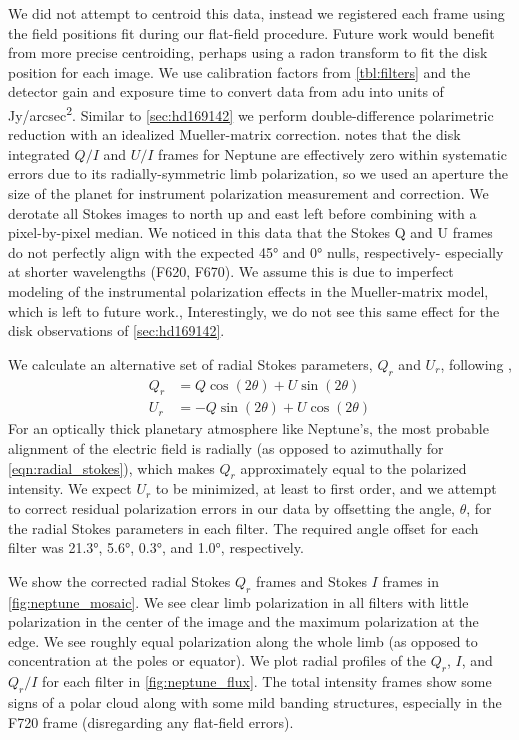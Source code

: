 We did not attempt to centroid this data, instead we registered each frame using the field positions fit during our flat-field procedure. Future work would benefit from more precise centroiding, perhaps using a radon transform to fit the disk position for each image. We use calibration factors from \autoref{tbl:filters} and the detector gain and exposure time to convert data from \si{adu} into units of \si{Jy/arcsec^2}. Similar to \autoref{sec:hd169142} we perform double-difference polarimetric reduction with an idealized Mueller-matrix correction. \citet{schmid_limb_2006} notes that the disk integrated $Q/I$ and $U/I$ frames for Neptune are effectively zero within systematic errors due to its radially-symmetric limb polarization, so we used an aperture the size of the planet for instrument polarization measurement and correction. We derotate all Stokes images to north up and east left before combining with a pixel-by-pixel median. We noticed in this data that the Stokes Q and U frames do not perfectly align with the expected \ang{45} and \ang{0} nulls, respectively- especially at shorter wavelengths (F620, F670). We assume this is due to imperfect modeling of the instrumental polarization effects in the Mueller-matrix model, which is left to future work., Interestingly, we do not see this same effect for the disk observations of \autoref{sec:hd169142}.

We calculate an alternative set of radial Stokes parameters, $Q_r$ and $U_r$, following \citet{schmid_limb_2006},
\begin{align}
    Q_r &= Q\cos{\left(2\theta\right)} + U\sin{\left(2\theta\right)} \\
    U_r &= -Q\sin{\left(2\theta\right)} + U\cos{\left(2\theta\right)}
\end{align}
For an optically thick planetary atmosphere like Neptune's, the most probable alignment of the electric field is radially (as opposed to azimuthally for \autoref{eqn:radial_stokes}), which makes $Q_r$ approximately equal to the polarized intensity. We expect $U_r$ to be minimized, at least to first order, and we attempt to correct residual polarization errors in our data by offsetting the angle, $\theta$, for the radial Stokes parameters in each filter. The required angle offset for each filter was \ang{21.3}, \ang{5.6}, \ang{0.3}, and \ang{1.0}, respectively.

We show the corrected radial Stokes $Q_r$ frames and Stokes $I$ frames in \autoref{fig:neptune_mosaic}. We see clear limb polarization in all filters with little polarization in the center of the image and the maximum polarization at the edge. We see roughly equal polarization along the whole limb (as opposed to concentration at the poles or equator). We plot radial profiles of the $Q_r$, $I$, and $Q_r/I$ for each filter in \autoref{fig:neptune_flux}. The total intensity frames show some signs of a polar cloud along with some mild banding structures, especially in the F720 frame (disregarding any flat-field errors).

